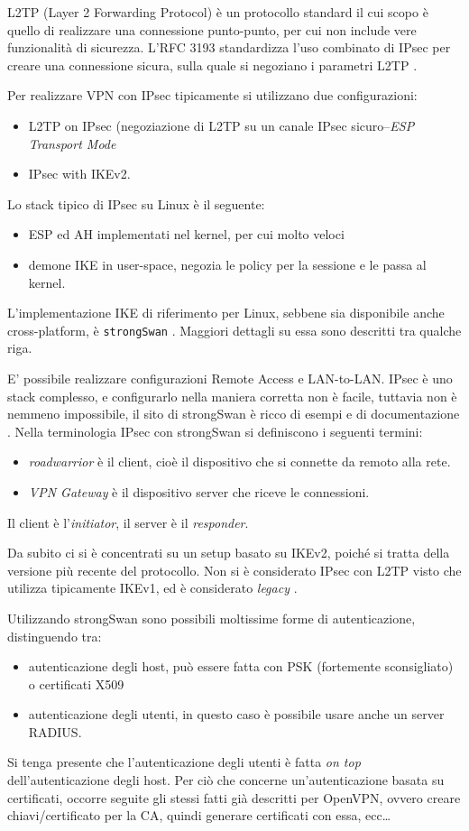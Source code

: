 L2TP (Layer 2 Forwarding Protocol) è un protocollo standard il cui scopo è quello
di realizzare una connessione punto-punto, per cui non include vere funzionalità
di sicurezza. L'RFC 3193 standardizza l'uso combinato di IPsec per creare una
connessione sicura, sulla quale si negoziano
i parametri L2TP \cite{RFC3193}.


Per realizzare VPN con IPsec tipicamente si utilizzano due configurazioni:
\begin{itemize}
  \item L2TP on IPsec (negoziazione di L2TP su un canale IPsec sicuro--\textit{ESP Transport Mode}
  \item IPsec with IKEv2.
\end{itemize}


Lo stack tipico di IPsec su Linux è il seguente:
\begin{itemize}
  \item ESP ed AH implementati nel kernel, per cui molto veloci
  \item demone IKE in user-space, negozia le policy per la sessione e le
  passa al kernel.
\end{itemize}
L'implementazione IKE di riferimento per Linux, sebbene sia disponibile anche
cross-platform, è \texttt{strongSwan} \cite{strongswan}. Maggiori dettagli su essa sono descritti
tra qualche riga.


E' possibile realizzare configurazioni Remote Access e LAN-to-LAN. IPsec è uno stack
complesso, e configurarlo nella maniera corretta non è facile, tuttavia non è nemmeno
impossibile, il sito di strongSwan è ricco di esempi e di documentazione \cite{strongswan-example}.
Nella terminologia IPsec con strongSwan si definiscono i seguenti termini:
\begin{itemize}
  \item \textit{roadwarrior} è il client, cioè il dispositivo che si connette da remoto alla rete.
  \item \textit{VPN Gateway} è il dispositivo server che riceve le connessioni.
\end{itemize}
Il client è l'\textit{initiator},
il server è il \textit{responder}.

Da subito ci si è concentrati su un setup basato su IKEv2, poiché si tratta della
versione più recente del protocollo. Non si è considerato IPsec con L2TP
visto che utilizza tipicamente IKEv1, ed è considerato \textit{legacy} \cite{nordvpn}.

Utilizzando strongSwan sono possibili moltissime forme di autenticazione, distinguendo tra:
\begin{itemize}
  \item autenticazione degli host, può essere fatta con PSK (fortemente sconsigliato) o certificati X509
  \item autenticazione degli utenti, in questo caso è possibile usare anche un
  server RADIUS.
\end{itemize}
Si tenga presente che l'autenticazione degli utenti è fatta \textit{on top} dell'autenticazione
degli host.
Per ciò che concerne un'autenticazione basata su certificati, occorre seguite gli stessi
fatti già descritti per OpenVPN, ovvero creare chiavi/certificato per la CA, quindi generare
certificati con essa, ecc\ldots


